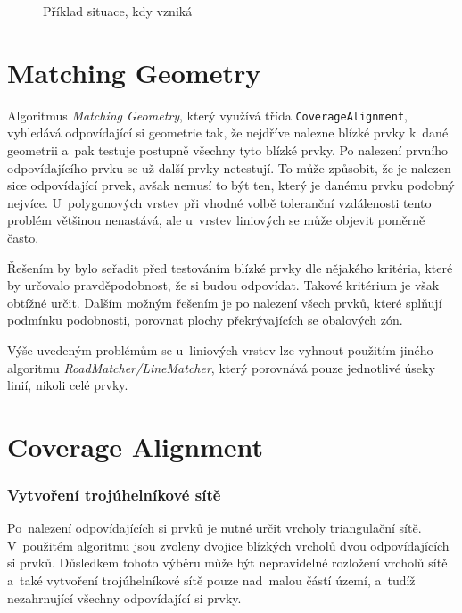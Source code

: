   \begin{figure}[H]
    \centering
      \def\svgwidth{320pt}
      
      \caption{Příklad situace, kdy vzniká }
      \label{fig:toothpic}
  \end{figure}


\section{Matching Geometry}
\label{problemy-mg}

Algoritmus \textit{Matching Geometry}, který využívá třída 
\texttt{CoverageAlignment}, vyhledává odpovídající si geometrie tak,
že nejdříve nalezne blízké prvky k~dané geometrii a~pak testuje postupně všechny
tyto blízké prvky. Po nalezení prvního odpovídajícího prvku se už další prvky
netestují. To může způsobit, že je nalezen sice odpovídající prvek, avšak
nemusí to být ten, který je danému prvku podobný nej\-více. U~polygonových vrstev
při vhodné volbě tole\-ranční vzdálenosti tento problém většinou nenastává, 
ale u~vrstev liniových se může objevit poměrně často. 

Řešením by bylo seřadit před testováním blízké prvky dle nějakého
kritéria, které by určovalo pravděpodobnost, že si budou odpovídat. Takové
kritérium je však obtížné určit. Dalším možným řešením je po nalezení všech 
prvků, které splňují podmínku podobnosti, porovnat plochy překrývajících se 
obalových zón. 

Výše uvedeným problémům se u~liniových vrstev lze vyhnout použitím jiného
algoritmu \textit{RoadMatcher/LineMatcher}, který porovnává pouze jednotlivé
úseky linií, nikoli celé prvky. 

\section{Coverage Alignment}
\label{problemy-ca}

\subsubsection{Vytvoření trojúhelníkové sítě}
Po~nalezení odpovídajících si prvků je nutné určit vrcholy triangulační sítě.
V~po\-užitém algoritmu jsou zvoleny dvojice blízkých vrcholů dvou odpovídajících
si prvků. Důsledkem tohoto výběru může být nepravidelné rozložení vrcholů sítě
a~také vy\-tvoření trojúhelníkové sítě pouze nad~malou částí území, a~tudíž 
nezahrnující všechny odpovídající si prvky.

